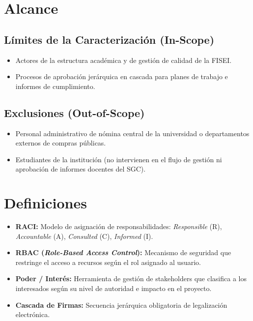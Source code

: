 \documentclass[12pt,a4paper]{article}
\begin{document}
\section{Alcance}

\subsection{Límites de la Caracterización (In-Scope)}
\begin{itemize}[leftmargin=1.5em, itemsep=1.5pt]
    \item Actores de la estructura académica y de gestión de calidad de la FISEI.
    \item Procesos de aprobación jerárquica en cascada para planes de trabajo e informes de cumplimiento.
\end{itemize}

\subsection{Exclusiones (Out-of-Scope)}
\begin{itemize}[leftmargin=1.5em, itemsep=1.5pt]
    \item Personal administrativo de nómina central de la universidad o departamentos externos de compras públicas.
    \item Estudiantes de la institución (no intervienen en el flujo de gestión ni aprobación de informes docentes del SGC).
\end{itemize}

\section{Definiciones}
\begin{itemize}[leftmargin=1.5em, itemsep=2pt]
    \item \textbf{RACI:} Modelo de asignación de responsabilidades: \textit{Responsible} (R), \textit{Accountable} (A), \textit{Consulted} (C), \textit{Informed} (I).
    \item \textbf{RBAC (\textit{Role-Based Access Control}):} Mecanismo de seguridad que restringe el acceso a recursos según el rol asignado al usuario.
    \item \textbf{Poder / Interés:} Herramienta de gestión de stakeholders que clasifica a los interesados según su nivel de autoridad e impacto en el proyecto.
    \item \textbf{Cascada de Firmas:} Secuencia jerárquica obligatoria de legalización electrónica.
\end{itemize}
\end{document}
